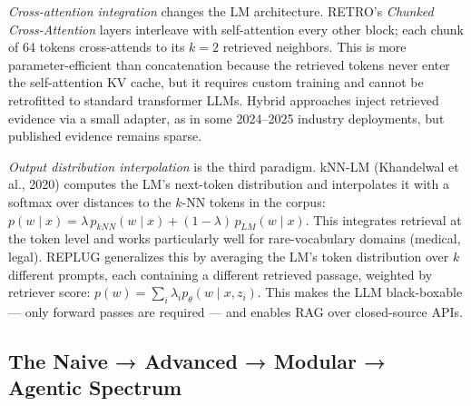 \emph{Cross-attention integration} changes the LM architecture. RETRO's \emph{Chunked Cross-Attention} layers interleave with self-attention every other block; each chunk of 64 tokens cross-attends to its \(k=2\) retrieved neighbors. This is more parameter-efficient than concatenation because the retrieved tokens never enter the self-attention KV cache, but it requires custom training and cannot be retrofitted to standard transformer LLMs. Hybrid approaches inject retrieved evidence via a small adapter, as in some 2024--2025 industry deployments, but published evidence remains sparse.

\emph{Output distribution interpolation} is the third paradigm. kNN-LM (Khandelwal et al., 2020) computes the LM's next-token distribution and interpolates it with a softmax over distances to the \(k\)-NN tokens in the corpus: \(p(w \mid x) = \lambda \, p_{kNN}(w \mid x) + (1 - \lambda) \, p_{LM}(w \mid x)\). This integrates retrieval at the token level and works particularly well for rare-vocabulary domains (medical, legal). REPLUG generalizes this by averaging the LM's token distribution over \(k\) different prompts, each containing a different retrieved passage, weighted by retriever score: \(p(w) = \sum_i \lambda_i p_\theta(w \mid x, z_i)\). This makes the LLM black-boxable --- only forward passes are required --- and enables RAG over closed-source APIs.

\subsection{The Naive → Advanced → Modular → Agentic Spectrum}\label{the-naive-advanced-modular-agentic-spectrum}

